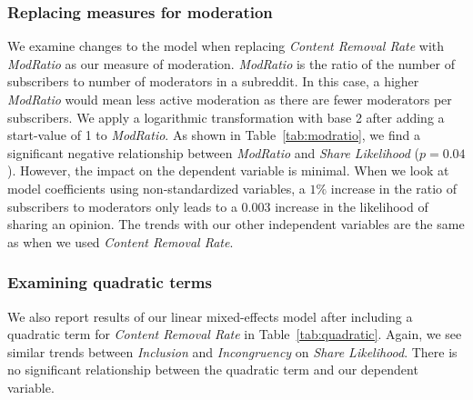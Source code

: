 \subsubsection{Replacing measures for moderation} We examine changes to the model when replacing \textit{Content Removal Rate} with \textit{ModRatio} as our measure of moderation. \textit{ModRatio} is the ratio of the number of subscribers to number of moderators in a subreddit. In this case, a higher \textit{ModRatio} would mean less active moderation as there are fewer moderators per subscribers. We apply a logarithmic transformation with base 2 after adding a start-value of 1 to \textit{ModRatio}. As shown in Table~\ref{tab:modratio}, we find a significant negative relationship between \textit{ModRatio} and \textit{Share Likelihood} ($p=0.04$). However, the impact on the dependent variable is minimal. When we look at model coefficients using non-standardized variables, a $1\%$ increase in the ratio of subscribers to moderators only leads to a $0.003$ increase in the likelihood of sharing an opinion. The trends with our other independent variables are the same as when we used \textit{Content Removal Rate}.

\subsubsection{Examining quadratic terms} We also report results of our linear mixed-effects model after including a quadratic term for \textit{Content Removal Rate} in Table~\ref{tab:quadratic}. Again, we see similar trends between \textit{Inclusion} and \textit{Incongruency} on \textit{Share Likelihood}. There is no significant relationship between the quadratic term and our dependent variable. 





